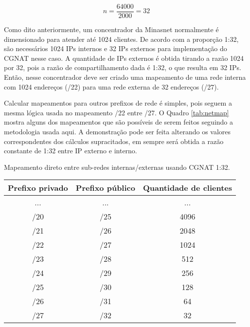     \begin{equation}
        n = \frac{64000}{2000}
          = 32
    \end{equation}

    Como dito anteriormente, um concentrador da Minasnet normalmente é dimensionado para atender até 1024 clientes. De acordo com a proporção 1:32, são necessários 1024 IPs internos e 32 IPs externos  para implementação do CGNAT nesse caso. A quantidade de IPs externos é obtida tirando a razão 1024 por 32, pois a razão de compartilhamento dada é 1:32, o que resulta em 32 IPs. Então, nesse concentrador deve ser criado uma mapeamento de uma rede interna com 1024 endereços (/22) para uma rede externa de 32 endereços (/27).
    
    Calcular mapeamentos para outros prefixos de rede é simples, pois seguem a mesma lógica usada no mapeamento /22 entre /27. O Quadro \ref{tab:netmap} mostra alguns dos mapeamentos que são possíveis de serem feitos seguindo a metodologia usada aqui. A demonstração pode ser feita alterando os valores correspondentes dos cálculos supracitados, em sempre será obtida a razão constante de 1:32 entre IP externo e interno.

    \begin{quadro}[htb]
        \begin{center}
            \caption{Mapeamento direto entre sub-redes internas/externas usando CGNAT 1:32.} 
            \label{tab:netmap}
            \vspace{0.2cm}
            \footnotesize
            \begin{tabular}{|c|c|c|}
            \hline
            Prefixo privado & Prefixo público & Quantidade de clientes \\
            \hline
            \hline
            ... & ... & ... \\
            /20 & /25 & 4096 \\
            /21 & /26 & 2048 \\
            /22 & /27 & 1024 \\
            /23 & /28 & 512 \\
            /24 & /29 & 256 \\
            /25 & /30 & 128 \\
            /26 & /31 & 64 \\
            /27 & /32 & 32 \\
            \hline 
            \end{tabular}
        \end{center}
    \end{quadro}

